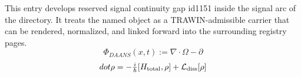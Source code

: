
\begin{tzpsnapshot}
\end{tzpsnapshot}

This entry develops reserved signal continuity gap id1151 inside the signal arc of the directory. It treats the named object as a TRAWIN-admissible carrier that can be rendered, normalized, and linked forward into the surrounding registry pages.
\[
\Phi_{DAANS}(x,t):=\nabla\cdot\Omega-\partial
\]
\[
dot\rho = -\tfrac{i}{\hbar}[H_{\rm total},\rho]+\mathcal L_{\rm diss}[\rho]
\]

